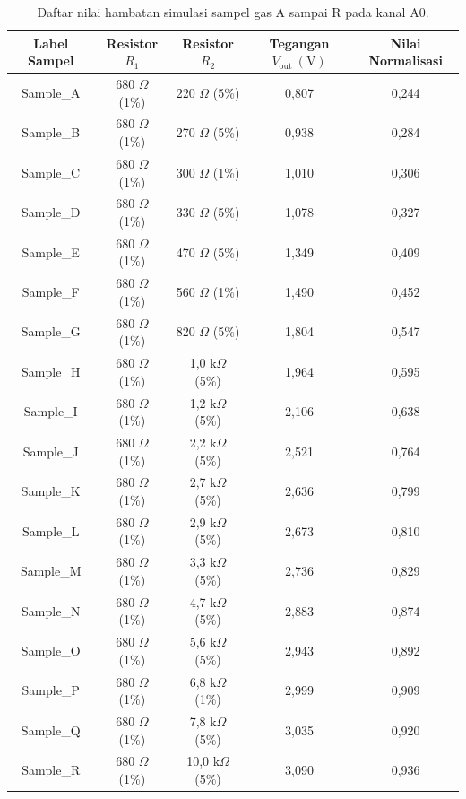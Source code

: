 \documentclass[12pt,a4paper]{article}
\begin{document}
	\begin{table}[H]
		\centering
		\begin{tabular}{ccccc}
			\toprule
			\textbf{Label Sampel} & \textbf{Resistor $R_1$} & \textbf{Resistor $R_2$} & \textbf{Tegangan $V_{\text{out}}\ (\text{V})$} & \textbf{Nilai Normalisasi} \\
			\midrule
			Sample\_A & 680 $\Omega$ (1\%) & 220 $\Omega$ (5\%) & 0,807 & 0,244 \\
			Sample\_B & 680 $\Omega$ (1\%) & 270 $\Omega$ (5\%) & 0,938 & 0,284 \\
			Sample\_C & 680 $\Omega$ (1\%) & 300 $\Omega$ (1\%) & 1,010 & 0,306 \\
			Sample\_D & 680 $\Omega$ (1\%) & 330 $\Omega$ (5\%) & 1,078 & 0,327 \\
			Sample\_E & 680 $\Omega$ (1\%) & 470 $\Omega$ (5\%) & 1,349 & 0,409 \\
			Sample\_F & 680 $\Omega$ (1\%) & 560 $\Omega$ (1\%) & 1,490 & 0,452 \\
			Sample\_G & 680 $\Omega$ (1\%) & 820 $\Omega$ (5\%) & 1,804 & 0,547 \\
			Sample\_H & 680 $\Omega$ (1\%) & 1,0 k$\Omega$ (5\%) & 1,964 & 0,595 \\
			Sample\_I & 680 $\Omega$ (1\%) & 1,2 k$\Omega$ (5\%) & 2,106 & 0,638 \\
			Sample\_J & 680 $\Omega$ (1\%) & 2,2 k$\Omega$ (5\%) & 2,521 & 0,764 \\
			Sample\_K & 680 $\Omega$ (1\%) & 2,7 k$\Omega$ (5\%) & 2,636 & 0,799 \\
			Sample\_L & 680 $\Omega$ (1\%) & 2,9 k$\Omega$ (5\%) & 2,673 & 0,810 \\
			Sample\_M & 680 $\Omega$ (1\%) & 3,3 k$\Omega$ (5\%) & 2,736 & 0,829 \\
			Sample\_N & 680 $\Omega$ (1\%) & 4,7 k$\Omega$ (5\%) & 2,883 & 0,874 \\
			Sample\_O & 680 $\Omega$ (1\%) & 5,6 k$\Omega$ (5\%) & 2,943 & 0,892 \\
			Sample\_P & 680 $\Omega$ (1\%) & 6,8 k$\Omega$ (1\%) & 2,999 & 0,909 \\
			Sample\_Q & 680 $\Omega$ (1\%) & 7,8 k$\Omega$ (5\%) & 3,035 & 0,920 \\
			Sample\_R & 680 $\Omega$ (1\%) & 10,0 k$\Omega$ (5\%) & 3,090 & 0,936 \\
			\bottomrule
		\end{tabular}
		\vspace{0.2cm}
		\caption{Daftar nilai hambatan simulasi sampel gas A sampai R pada kanal A0.}
	\end{table}
	
\end{document}
